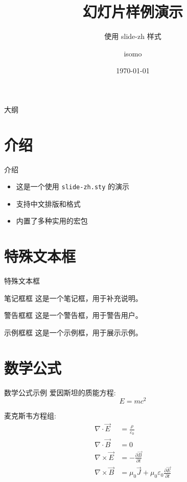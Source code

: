 \documentclass{beamer}
\title{幻灯片样例演示}
\subtitle{使用 slide-zh 样式}
\author{isomo}
\date{\today}
\begin{document}
\begin{frame}
  \titlepage
\end{frame}

\begin{frame}{大纲}
  \tableofcontents
\end{frame}

\section{介绍}
\begin{frame}{介绍}
  \begin{itemize}
    \item 这是一个使用 \texttt{slide-zh.sty} 的演示
    \item 支持中文排版和格式
    \item 内置了多种实用的宏包
  \end{itemize}
\end{frame}

\section{特殊文本框}
\begin{frame}{特殊文本框}
  \begin{block}{笔记框框}
    这是一个笔记框，用于补充说明。
  \end{block}
  \begin{alertblock}{警告框框}
    这是一个警告框，用于警告用户。
  \end{alertblock}
  \begin{exampleblock}{示例框框}
    这是一个示例框，用于展示示例。
  \end{exampleblock}
\end{frame}

\section{数学公式}
\begin{frame}{数学公式示例}
  爱因斯坦的质能方程:
  \begin{equation}
    E = mc^2
  \end{equation}

  麦克斯韦方程组:
  \begin{align}
    \nabla \cdot \vec{E} &= \frac{\rho}{\varepsilon_0} \\
    \nabla \cdot \vec{B} &= 0 \\
    \nabla \times \vec{E} &= -\frac{\partial \vec{B}}{\partial t} \\
    \nabla \times \vec{B} &= \mu_0\vec{J} + \mu_0\varepsilon_0\frac{\partial \vec{E}}{\partial t}
  \end{align}
\end{frame}
\end{document}
